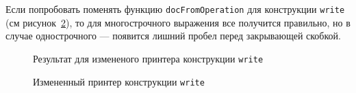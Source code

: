 Если попробовать поменять функцию \lstinline[language=Haskell]{docFromOperation} для конструкции \lstinline[language=llang]{write} (см рисунок~\ref{fig:lHughesWriteChange}),
то для многострочного выражения все получится правильно, но в случае однострочного --- появится лишний пробел перед закрывающей скобкой.

\begin{figure}[h!]
	
	\caption{Результат для измененого принтера конструкции \lstinline[language=llang]{write}}
	\label{fig:lBadWriteEx}
\end{figure}

\begin{figure}[h!]
	
	\caption{Измененный принтер конструкции \lstinline[language=llang]{write}}
	\label{fig:lHughesWriteChange}
\end{figure}